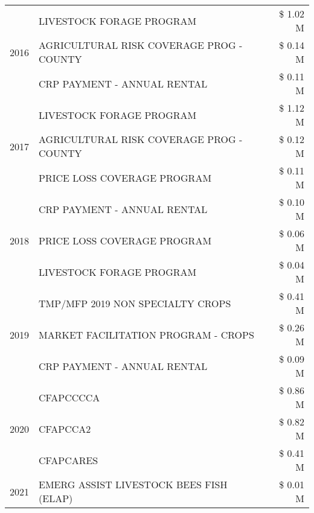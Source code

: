 \begin{tabular}{llr}
\cline{1-3}
\multirow[t]{3}{*}{2016} & LIVESTOCK FORAGE PROGRAM                      & \$ 1.02 M \\
 & AGRICULTURAL RISK COVERAGE PROG - COUNTY      & \$ 0.14 M \\
 & CRP PAYMENT - ANNUAL RENTAL                   & \$ 0.11 M \\
\cline{1-3}
\multirow[t]{3}{*}{2017} & LIVESTOCK FORAGE PROGRAM & \$ 1.12 M \\
 & AGRICULTURAL RISK COVERAGE PROG - COUNTY & \$ 0.12 M \\
 & PRICE LOSS COVERAGE PROGRAM & \$ 0.11 M \\
\cline{1-3}
\multirow[t]{3}{*}{2018} & CRP PAYMENT - ANNUAL RENTAL & \$ 0.10 M \\
 & PRICE LOSS COVERAGE PROGRAM & \$ 0.06 M \\
 & LIVESTOCK FORAGE PROGRAM & \$ 0.04 M \\
\cline{1-3}
\multirow[t]{3}{*}{2019} & TMP/MFP 2019 NON SPECIALTY CROPS & \$ 0.41 M \\
 & MARKET FACILITATION PROGRAM - CROPS & \$ 0.26 M \\
 & CRP PAYMENT - ANNUAL RENTAL & \$ 0.09 M \\
\cline{1-3}
\multirow[t]{3}{*}{2020} & CFAPCCCCA & \$ 0.86 M \\
 & CFAPCCA2 & \$ 0.82 M \\
 & CFAPCARES & \$ 0.41 M \\
\cline{1-3}
2021 & EMERG ASSIST LIVESTOCK BEES FISH (ELAP) & \$ 0.01 M \\
\cline{1-3}
\bottomrule
\end{tabular}
